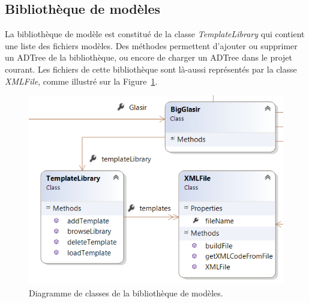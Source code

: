 	    
	\subsection{Bibliothèque de modèles}
    	\label{sec:diagClassBib}
    	La bibliothèque de modèle est constitué de la classe \emph{TemplateLibrary} qui contient une liste des fichiers modèles. Des méthodes permettent d'ajouter ou supprimer un ADTree de la bibliothèque, ou encore de charger un ADTree dans le projet courant. Les fichiers de cette bibliothèque sont là-aussi représentés par la classe \emph{XMLFile}, comme illustré sur la {\sc Figure}~\ref{fig:lib}.
    	
    	\begin{figure}[H]
	        \centering
	        \includegraphics[height=0.5\textwidth]{figure/library.png}
	        \caption{Diagramme de classes de la bibliothèque de modèles.}
	        \label{fig:lib}
	    \end{figure}